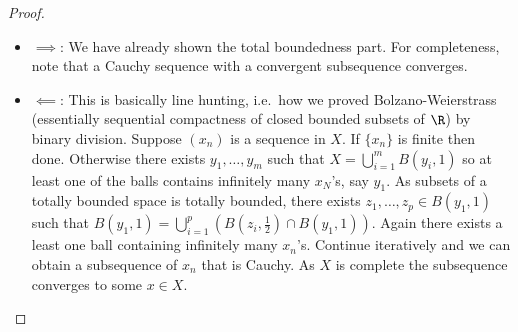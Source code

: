 \documentclass[a4paper]{article}
\begin{document}
\begin{proof}\leavevmode
  \begin{itemize}
  \item \(\implies\): We have already shown the total boundedness part. For completeness, note that a Cauchy sequence with a convergent subsequence converges.
  \item \(\impliedby\): This is basically line hunting, i.e.\ how we proved Bolzano-Weierstrass (essentially sequential compactness of closed bounded subsets of \(\R\)) by binary division. Suppose \((x_n)\) is a sequence in \(X\). If \(\{x_n\}\) is finite then done. Otherwise there exists \(y_1, \dots, y_m\) such that \(X = \bigcup_{i = 1}^m B(y_i, 1)\) so at least one of the balls contains infinitely many \(x_N\)'s, say \(y_1\). As subsets of a totally bounded space is totally bounded, there exists \(z_1, \dots, z_p \in B(y_1, 1)\) such that \(B(y_1, 1) = \bigcup_{i = 1}^p (B(z_i, \frac{1}{2}) \cap B(y_1, 1))\). Again there exists a least one ball containing infinitely many \(x_n\)'s. Continue iteratively and we can obtain a subsequence of \(x_n\) that is Cauchy. As \(X\) is complete the subsequence converges to some \(x \in X\).
  \end{itemize}
\end{proof}
\end{document}
